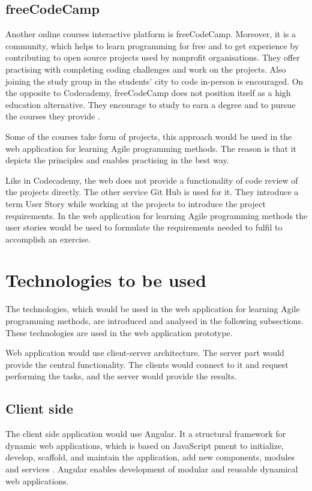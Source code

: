 \subsection{freeCodeCamp}

Another online courses interactive platform is freeCodeCamp. Moreover, it is a community, which helps to learn programming for free and to get experience by contributing to open source projects used by nonprofit organisations. They offer practising with completing coding challenges and work on the projects. Also joining the study group in the students' city to code in-person is encouraged. On the opposite to Codecademy, freeCodeCamp does not position itself as a high education alternative. They encourage to study to earn a degree and to pursue the courses they provide \cite{feecodecamp}.

Some of the courses take form of projects, this approach would be used in the web application for learning Agile programming methods. The reason is that it depicts the principles and enables practising in the best way. 

Like in Codecademy, the web does not provide a functionality of code review of the projects directly. The other service Git Hub is used for it. They introduce a term User Story while working at the projects to introduce the project requirements. In the web application for learning Agile programming methods the user stories would be used to formulate the requirements needed to fulfil to accomplish an exercise.

\section{Technologies to be used}
\label{sect:tech}

The technologies, which would be used in the web application for learning Agile programming methods, are introduced and analysed in the following subsections. These technologies are used in the web application prototype.

Web application would use client-server architecture. The server part would provide the central functionality. The clients would connect to it and request performing the tasks, and the server would provide the results.

\subsection{Client side}

The client side application would use Angular. It a structural framework for dynamic web applications, which is based on JavaScript pment to initialize, develop, scaffold, and maintain the application, add new components, modules and services \cite{angular_cli}. Angular enables development of modular and reusable dynamical web applications.

